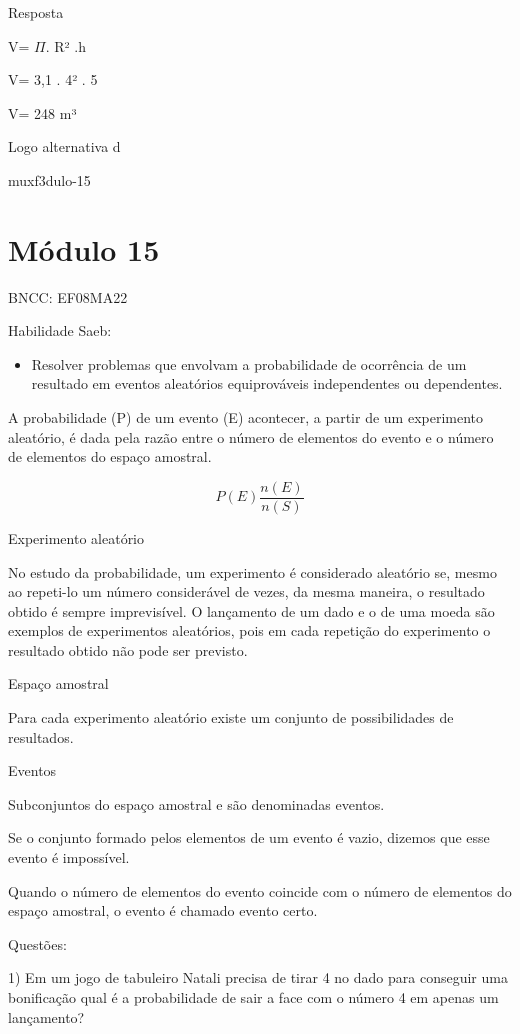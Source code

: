{Resposta

V= \(\Pi\). R² .h

V= 3,1 . 4² . 5

V= 248 m³

Logo alternativa d

muxf3dulo-15}{%
\section{Módulo 15}

BNCC: EF08MA22

Habilidade Saeb:

\begin{itemize}
\tightlist
\item
  Resolver problemas que envolvam a probabilidade de ocorrência de um
  resultado em eventos aleatórios equiprováveis independentes ou
  dependentes.
\end{itemize}

A probabilidade (P) de um evento (E) acontecer, a partir de um
experimento aleatório, é dada pela razão entre o número de elementos do
evento e o número de elementos do espaço amostral.

\[P(E)\frac{n(E)}{n(S)}\]

Experimento aleatório

No estudo da probabilidade, um experimento é considerado aleatório se,
mesmo ao repeti-lo um número considerável de vezes, da mesma maneira, o
resultado obtido é sempre imprevisível. O lançamento de um dado e o de
uma moeda são exemplos de experimentos aleatórios, pois em cada
repetição do experimento o resultado obtido não pode ser previsto.

Espaço amostral

Para cada experimento aleatório existe um conjunto de possibilidades de
resultados.

Eventos

Subconjuntos do espaço amostral e são denominadas eventos.

Se o conjunto formado pelos elementos de um evento é vazio, dizemos que
esse evento é impossível.

Quando o número de elementos do evento coincide com o número de
elementos do espaço amostral, o evento é chamado evento certo.

Questões:

1) Em um jogo de tabuleiro Natali precisa de tirar 4 no dado para
conseguir uma bonificação qual é a probabilidade de sair a face com o
número 4 em apenas um lançamento?

}
